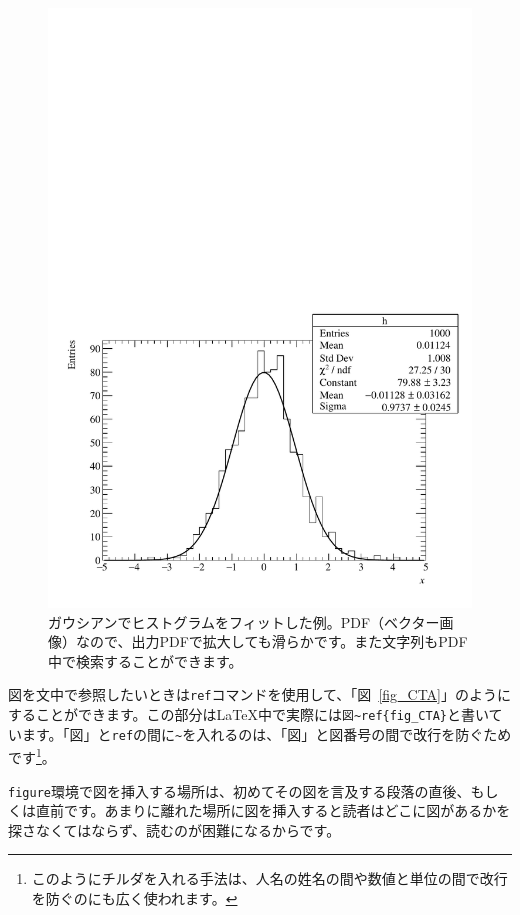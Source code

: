 \begin{figure}
  \centering
  \includegraphics[width=14cm]{fig/histogram.pdf}
  \caption[ガウシアンでヒストグラムをフィットした例]{ガウシアンでヒストグラムをフィットした例。PDF（ベクター画像）なので、出力PDFで拡大しても滑らかです。また文字列もPDF中で検索することができます。}
  \label{fig_histogram}
\end{figure}

図を文中で参照したいときは\texttt{ref}コマンドを使用して、「図~\ref{fig_CTA}」のようにすることができます。この部分は\LaTeX{}中で実際には\texttt{図\~{}\bs{}ref\{fig\_CTA\}}と書いています。「図」と\texttt{\bs{}ref}の間に\texttt{\~{}}を入れるのは、「図」と図番号の間で改行を防ぐためです\footnote{このようにチルダを入れる手法は、人名の姓名の間や数値と単位の間で改行を防ぐのにも広く使われます。}。

\texttt{figure}環境で図を挿入する場所は、初めてその図を言及する段落の直後、もしくは直前です。あまりに離れた場所に図を挿入すると読者はどこに図があるかを探さなくてはならず、読むのが困難になるからです。

